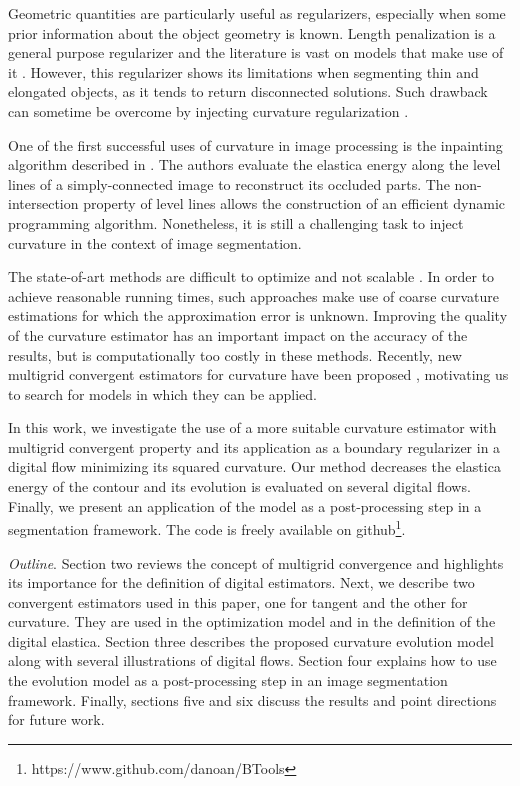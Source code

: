 \documentclass[runningheads]{llncs}
\begin{document}
Geometric quantities are particularly useful as regularizers, especially when some prior information about the object
geometry is known. Length penalization is a general purpose regularizer and the literature is vast on models
that make use of it \cite{casseles97,appleton05}. However, this regularizer shows its limitations when segmenting thin
and elongated objects, as it tends to return disconnected solutions. Such drawback can sometime be overcome by injecting
curvature regularization \cite{zehiry10}.
				
One of the first successful uses of curvature in image processing is the inpainting algorithm described in
\cite{masnou98}. The authors evaluate the elastica energy along the level lines of a simply-connected image to
reconstruct its occluded parts. The non-intersection property of level lines allows the construction of an efficient
dynamic programming algorithm. Nonetheless, it is still a challenging task to inject curvature in the context of image
segmentation.

The state-of-art methods are difficult to optimize and not scalable \cite{zehiry10,schoenemann09,nieuwenhuis14}. In
order to achieve reasonable running times, such approaches make use of coarse curvature estimations for which the approximation
error is unknown. Improving the quality of the curvature estimator has an important impact on the accuracy of the
results, but is computationally too costly in these methods. Recently, new multigrid convergent estimators for curvature
have been proposed \cite{schindele17,coeurjolly13,roussillon11}, motivating us to search for models in which they can be
applied.

In this work, we investigate the use of a more suitable curvature estimator with multigrid convergent property and its
application as a boundary regularizer in a digital flow minimizing its squared curvature. Our method decreases the
elastica energy of the contour and its evolution is evaluated on several digital flows. Finally, we present an
application of the model as a post-processing step in a segmentation framework. The code is freely available on
github\footnote{https://www.github.com/danoan/BTools}.

\textit{Outline}. Section two reviews the concept of multigrid convergence and highlights its importance for the
definition of digital estimators. Next, we describe two convergent estimators used in this paper, one for tangent and
the other for curvature. They are used in the optimization model and in the definition of the digital elastica. Section
three describes the proposed curvature evolution model along with several illustrations of digital flows. Section four
explains how to use the evolution model as a post-processing step in an image segmentation framework. Finally, sections
five and six discuss the results and point directions for future work.
\end{document}
